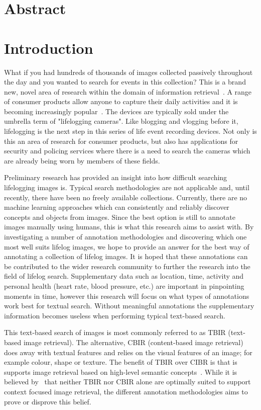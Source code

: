 \section{Abstract}

\section{Introduction}

What if you had hundreds of thousands of images collected passively throughout the day and you wanted to search for events in this collection? This is a brand new, novel area of research within the domain of information retrieval~\citep{gurrin2014lifelogging}. A range of consumer products allow anyone to capture their daily activities and it is becoming increasingly popular~\citep{gurrin2014lifelogging}\citep{van2014future}\citep{askoxylakis2011log}. The devices are typically sold under the umbrella term of "lifelogging cameras". Like blogging and vlogging before it, lifelogging is the next step in this series of life event recording devices. Not only is this an area of research for consumer products, but also has applications for security and policing services where there is a need to search the cameras which are already being worn by members of these fields.

Preliminary research has provided an insight into how difficult searching lifelogging images is. Typical search methodologies are not applicable and, until recently, there have been no freely available collections. Currently, there are no machine learning approaches which can consistently and reliably discover concepts and objects from images. Since the best option is still to annotate images manually using humans, this is what this research aims to assist with. By investigating a number of annotation methodologies and discovering which one most well suits lifelog images, we hope to provide an answer for the best way of annotating a collection of lifelog images. It is hoped that these annotations can be contributed to the wider research community to further the research into the field of lifelog search. Supplementary data such as location, time, activity and personal health (heart rate, blood pressure, etc.) are important in pinpointing moments in time, however this research will focus on what types of annotations work best for textual search. Without meaningful annotations the supplementary information becomes useless when performing typical text-based search.

This text-based search of images is most commonly referred to as TBIR (text-based image retrieval). The alternative, CBIR (content-based image retrieval) does away with textual features and relies on the visual features of an image; for example colour, shape or texture. The benefit of TBIR over CIBR is that is supports image retrieval based on high-level semantic concepts~\citep{hartvedt2010using}. While it is believed by~\citep{hartvedt2010using} that neither TBIR nor CBIR alone are optimally suited to support context focused image retrieval, the different annotation methodologies aims to prove or disprove this belief.

